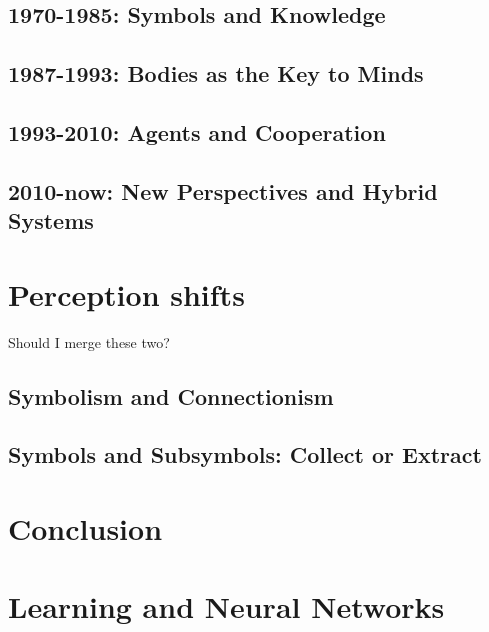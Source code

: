 \documentclass[oneside]{report}
\begin{document}
\section{1970-1985: Symbols and Knowledge}


\section{1987-1993: Bodies as the Key to Minds}


\section{1993-2010: Agents and Cooperation}


\section{2010-now: New Perspectives and Hybrid Systems}


\chapter{Perception shifts}
Should I merge these two?
\section{Symbolism and Connectionism}
\section{Symbols and Subsymbols: Collect or Extract}

\chapter{Conclusion}

\appendix
\chapter{Learning and Neural Networks}


\printbibliography
\end{document}
